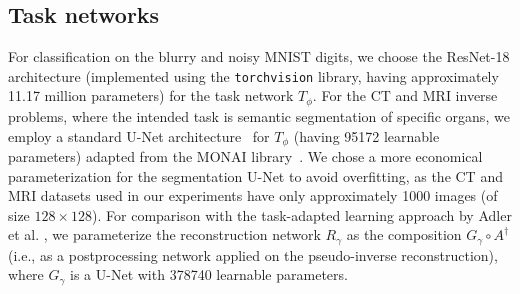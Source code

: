 



\subsection{Task networks}
For classification on the blurry and noisy MNIST digits, we choose the ResNet-18 architecture \cite{he2016deep} (implemented using the \texttt{torchvision} library, having approximately 11.17 million parameters) for the task network $T_{\phi}$. For the CT and MRI inverse problems, where the intended task is semantic segmentation of specific organs, we employ a standard U-Net architecture~\cite{kerfoot2018left} for $T_{\phi}$ (having 95172 learnable parameters) adapted from the MONAI library~\cite{cardoso2022monai}. We chose a more economical parameterization for the segmentation U-Net to avoid overfitting, as the CT and MRI datasets used in our experiments have only approximately 1000 images (of size $128\times 128$). For comparison with the task-adapted learning approach by Adler et al. \cite{adler2022task}, we parameterize the reconstruction network $R_{\gamma}$ as the composition $G_{\gamma}\circ A^{\dagger}$ (i.e., as a postprocessing network applied on the pseudo-inverse reconstruction), where $G_{\gamma}$ is a U-Net with 378740 learnable parameters.  






